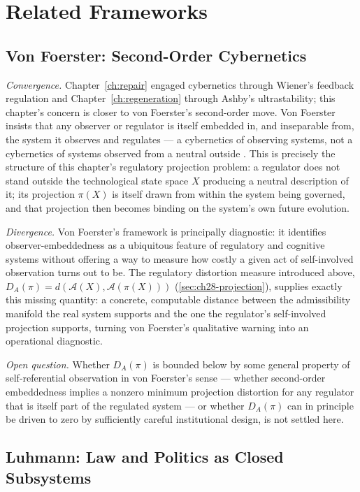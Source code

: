 \documentclass[12pt,twoside,openright]{book}
\newcommand{\adm}{\mathcal{A}}
\begin{document}
\section{Related Frameworks}
\label{sec:ch28-related-frameworks}

\subsection*{Von Foerster: Second-Order Cybernetics}

\emph{Convergence.} Chapter~\ref{ch:repair} engaged cybernetics
through Wiener's feedback regulation and
Chapter~\ref{ch:regeneration} through Ashby's ultrastability;
this chapter's concern is closer to von Foerster's second-order
move. Von Foerster insists that any observer or regulator is
itself embedded in, and inseparable from, the system it observes
and regulates --- a cybernetics of observing systems, not a
cybernetics of systems observed from a neutral outside
\parencite{foerster1960}. This is precisely the structure of this
chapter's regulatory projection problem: a regulator does not
stand outside the technological state space $X$ producing a
neutral description of it; its projection $\pi(X)$ is itself
drawn from within the system being governed, and that projection
then becomes binding on the system's own future evolution.

\emph{Divergence.} Von Foerster's framework is principally
diagnostic: it identifies observer-embeddedness as a ubiquitous
feature of regulatory and cognitive systems without offering a
way to measure how costly a given act of self-involved
observation turns out to be. The regulatory distortion measure
introduced above, $D_A(\pi) = d(\adm(X), \adm(\pi(X)))$
(\cref{sec:ch28-projection}), supplies exactly this missing
quantity: a concrete, computable distance between the
admissibility manifold the real system supports and the one the
regulator's self-involved projection supports, turning von
Foerster's qualitative warning into an operational diagnostic.

\emph{Open question.} Whether $D_A(\pi)$ is bounded below by some
general property of self-referential observation in von
Foerster's sense --- whether second-order embeddedness implies a
nonzero minimum projection distortion for any regulator that is
itself part of the regulated system --- or whether $D_A(\pi)$ can
in principle be driven to zero by sufficiently careful
institutional design, is not settled here.

\subsection*{Luhmann: Law and Politics as Closed Subsystems}
\end{document}

